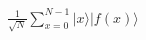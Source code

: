 \documentclass[preview]{standalone}
\begin{document}
\begin{align*}
\frac{1}{\sqrt{N}} \sum_{x=0}^{N-1} |x\rangle |f(x)\rangle
\end{align*}
\end{document}
